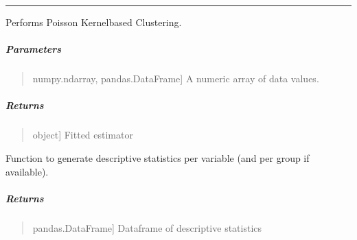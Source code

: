 \documentclass[letterpaper,10pt,english,openany,oneside]{sphinxmanual}
\begin{document}
\bigskip\hrule\bigskip


\begin{fulllineitems}
\label{\detokenize{api_reference/generated/QuadratiK.spherical_clustering.PKBC:QuadratiK.spherical_clustering.PKBC.fit}}
\pysigstartsignatures
{}
\pysigstopsignatures
\sphinxAtStartPar
Performs Poisson Kernel\sphinxhyphen{}based Clustering.


\subparagraph{Parameters}
\label{\detokenize{api_reference/generated/QuadratiK.spherical_clustering.PKBC:id1}}\begin{quote}
\begin{description}
\sphinxlineitem{dat}{[}numpy.ndarray, pandas.DataFrame{]}
\sphinxAtStartPar
A numeric array of data values.

\end{description}
\end{quote}


\subparagraph{Returns}
\label{\detokenize{api_reference/generated/QuadratiK.spherical_clustering.PKBC:returns}}\begin{quote}
\begin{description}
\sphinxlineitem{self}{[}object{]}
\sphinxAtStartPar
Fitted estimator

\end{description}
\end{quote}

\end{fulllineitems}


\begin{fulllineitems}
\label{\detokenize{api_reference/generated/QuadratiK.spherical_clustering.PKBC:QuadratiK.spherical_clustering.PKBC.stats}}
\pysigstartsignatures
{}
\pysigstopsignatures
\sphinxAtStartPar
Function to generate descriptive statistics per variable (and per group if available).


\subparagraph{Returns}
\label{\detokenize{api_reference/generated/QuadratiK.spherical_clustering.PKBC:id2}}\begin{quote}
\begin{description}
\sphinxlineitem{summary\_stats\_df}{[}pandas.DataFrame{]}
\sphinxAtStartPar
Dataframe of descriptive statistics

\end{description}
\end{quote}

\end{fulllineitems}
\end{document}
